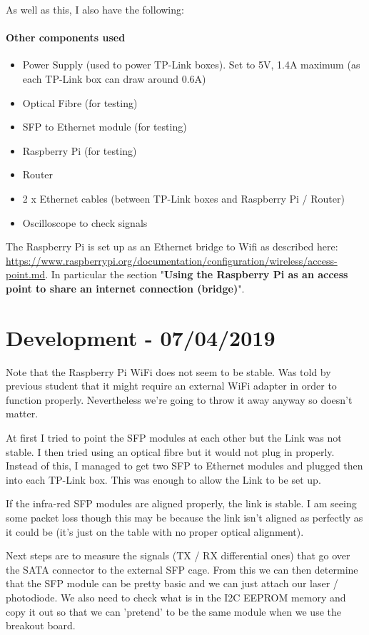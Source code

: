 As well as this, I also have the following:

\paragraph{\textbf{Other components used}}
\begin{itemize}
\item{Power Supply (used to power TP-Link boxes). Set to 5V, 1.4A maximum
(as each TP-Link box can draw around 0.6A)}
\item{Optical Fibre (for testing)}
\item{\ac{SFP} to Ethernet module (for testing)}
\item{Raspberry Pi (for testing)}
\item{Router}
\item{2 x Ethernet cables (between TP-Link boxes and Raspberry Pi / Router)}
\item{Oscilloscope to check signals}
\end{itemize}

The Raspberry Pi is set up as an Ethernet bridge to Wifi as described here:
\url{https://www.raspberrypi.org/documentation/configuration/wireless/access-point.md}.
In particular the section "\textbf{Using the Raspberry Pi as an access
point to share an internet connection (bridge)}".

\section{Development - 07/04/2019}
Note that the Raspberry Pi WiFi does not seem to be stable. Was told by previous
student that it might require an external WiFi adapter in order to function
properly. Nevertheless we're going to throw it away anyway so doesn't matter.

At first I tried to point the \ac{SFP} modules at each other but the Link was
not stable. I then tried using an optical fibre but it would not plug in
properly. Instead of this, I managed to get two \ac{SFP} to Ethernet modules
and plugged then into each TP-Link box. This was enough to allow the Link
to be set up.

If the infra-red \ac{SFP} modules are aligned properly, the link is stable.
I am seeing some packet loss though this may be because the link isn't aligned
as perfectly as it could be (it's just on the table with no proper optical
alignment).

Next steps are to measure the signals (TX / RX differential ones) that go over
the SATA connector to the external \ac{SFP} cage. From this we can then
determine that the \ac{SFP} module can be pretty basic and we can just attach
our laser / photodiode. We also need to check what is in the \ac{I2C} EEPROM
memory and copy it out so that we can 'pretend' to be the same module when
we use the breakout board.

